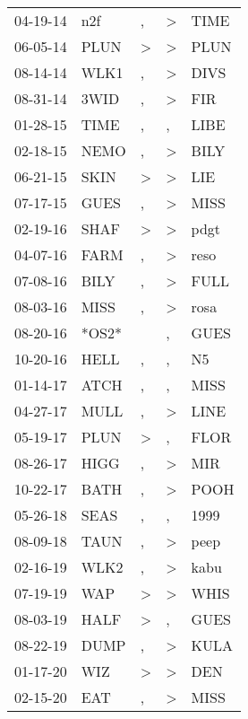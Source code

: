 \begin{supertabular}{lllll}
 04-19-14 &    n2f &             , &  \textgreater &   TIME \\
 06-05-14 &   PLUN &  \textgreater &  \textgreater &   PLUN \\
 08-14-14 &   WLK1 &             , &  \textgreater &   DIVS \\
 08-31-14 &   3WID &             , &  \textgreater &    FIR \\
 01-28-15 &   TIME &             , &             , &   LIBE \\
 02-18-15 &   NEMO &             , &  \textgreater &   BILY \\
 06-21-15 &   SKIN &  \textgreater &  \textgreater &    LIE \\
 07-17-15 &   GUES &             , &  \textgreater &   MISS \\
 02-19-16 &   SHAF &  \textgreater &  \textgreater &   pdgt \\
 04-07-16 &   FARM &             , &  \textgreater &   reso \\
 07-08-16 &   BILY &             , &  \textgreater &   FULL \\
 08-03-16 &   MISS &             , &  \textgreater &   rosa \\
 08-20-16 &  *OS2* &               &             , &   GUES \\
 10-20-16 &   HELL &             , &             , &     N5 \\
 01-14-17 &   ATCH &             , &             , &   MISS \\
 04-27-17 &   MULL &             , &  \textgreater &   LINE \\
 05-19-17 &   PLUN &  \textgreater &             , &   FLOR \\
 08-26-17 &   HIGG &             , &  \textgreater &    MIR \\
 10-22-17 &   BATH &             , &  \textgreater &   POOH \\
 05-26-18 &   SEAS &             , &             , &   1999 \\
 08-09-18 &   TAUN &             , &  \textgreater &   peep \\
 02-16-19 &   WLK2 &             , &  \textgreater &   kabu \\
 07-19-19 &    WAP &  \textgreater &  \textgreater &   WHIS \\
 08-03-19 &   HALF &  \textgreater &             , &   GUES \\
 08-22-19 &   DUMP &             , &  \textgreater &   KULA \\
 01-17-20 &    WIZ &  \textgreater &  \textgreater &    DEN \\
 02-15-20 &    EAT &             , &  \textgreater &   MISS \\
\end{supertabular}
